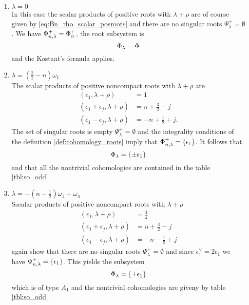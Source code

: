 \begin{enumerate}
 \item $\lambda = 0 $\\
       In this case the scalar products of positive roots with $\lambda+\rho$ are of course given by \eqref{eq:Bn_rho_scalar_posroots} and there are no singular roots $\Psi^+_\lambda = \emptyset$. We have $\Phi^+_{n,\lambda} = \Phi^+_n$, the root subsystem is
       \[
        \Phi_\lambda = \Phi
       \]
       and the Kostant's formula applies.
       
 \item $\lambda = (\frac{3}{2} - n)\omega_1  $\\
      The scalar products of positive noncompact roots with $\lambda+\rho$ are
      \begin{align*}
	(\epsilon_1, \lambda+\rho) &= 1 \\
	(\epsilon_1+\epsilon_j,\lambda+\rho) &=  n+\frac{3}{2}-j \\
	(\epsilon_1-\epsilon_j,\lambda+\rho) &= -n + \frac{1}{2} + j.
      \end{align*}
      The set of singular roots is empty $\Psi^+_\lambda = \emptyset$ and the integrality conditions of the definition \ref{def:cohomology_roots} imply that $\Phi^+_{n,\lambda} = \{ \epsilon_1 \}$. It follows that
      \[
       \Phi_\lambda = \{ \pm \epsilon_1 \} 
      \]
      and that all the nontrivial cohomologies are contained in the table \ref{tbl:so_odd}.
      
 \item $\lambda = -(n-\frac{1}{2})\omega_1 + \omega_n  $\\
      Sscalar products of positive noncompact roots with $\lambda+\rho$
      \begin{align*}
	(\epsilon_1, \lambda+\rho) &= \frac{1}{2} \\
	(\epsilon_1+\epsilon_j,\lambda+\rho) &=  n+\frac{3}{2}-j \\
	(\epsilon_1-\epsilon_j,\lambda+\rho) &= -n-\frac{1}{2}+j
      \end{align*}
      again show that there are no singular roots $\Psi^+_\lambda = \emptyset$ and since $\epsilon_1^\vee = 2\epsilon_1$ we have $\Phi^+_{n,\lambda} = \{ \epsilon_1 \}$. This yields the subsystem
      \[
       \Phi_\lambda = \{ \pm \epsilon_1 \} 
      \]
      which is of type $A_1$ and the nontrivial cohomologies are giveny by table \ref{tbl:so_odd}.
\end{enumerate}

